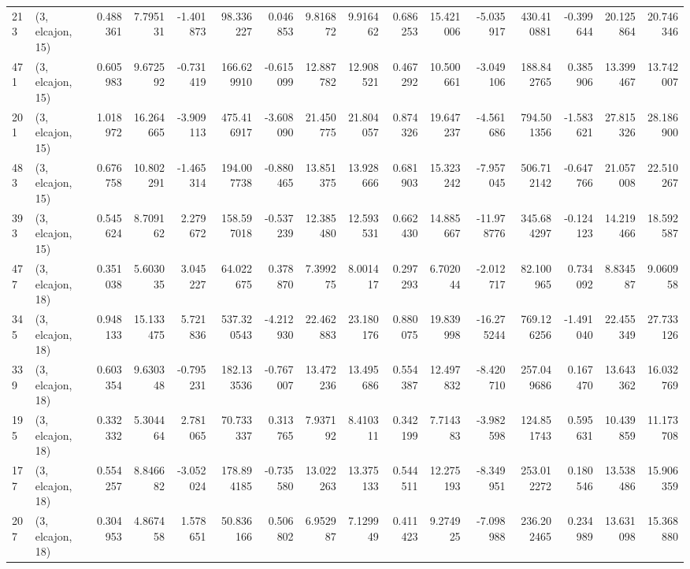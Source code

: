 \begin{tabular}{llrrrrrrrrrrrrrr}
213 &  (3, elcajon, 15) &   0.488361 &   7.795131 &  -1.401873 &    98.336227 &   0.046853 &   9.816872 &   9.916462 &  0.686253 &  15.421006 &  -5.035917 &   430.410881 &  -0.399644 &  20.125864 &  20.746346 \\
471 &  (3, elcajon, 15) &   0.605983 &   9.672592 &  -0.731419 &   166.629910 &  -0.615099 &  12.887782 &  12.908521 &  0.467292 &  10.500661 &  -3.049106 &   188.842765 &   0.385906 &  13.399467 &  13.742007 \\
201 &  (3, elcajon, 15) &   1.018972 &  16.264665 &  -3.909113 &   475.416917 &  -3.608090 &  21.450775 &  21.804057 &  0.874326 &  19.647237 &  -4.561686 &   794.501356 &  -1.583621 &  27.815326 &  28.186900 \\
483 &  (3, elcajon, 15) &   0.676758 &  10.802291 &  -1.465314 &   194.007738 &  -0.880465 &  13.851375 &  13.928666 &  0.681903 &  15.323242 &  -7.957045 &   506.712142 &  -0.647766 &  21.057008 &  22.510267 \\
393 &  (3, elcajon, 15) &   0.545624 &   8.709162 &   2.279672 &   158.597018 &  -0.537239 &  12.385480 &  12.593531 &  0.662430 &  14.885667 & -11.978776 &   345.684297 &  -0.124123 &  14.219466 &  18.592587 \\
477 &  (3, elcajon, 18) &   0.351038 &   5.603035 &   3.045227 &    64.022675 &   0.378870 &   7.399275 &   8.001417 &  0.297293 &   6.702044 &  -2.012717 &    82.100965 &   0.734092 &   8.834587 &   9.060958 \\
345 &  (3, elcajon, 18) &   0.948133 &  15.133475 &   5.721836 &   537.320543 &  -4.212930 &  22.462883 &  23.180176 &  0.880075 &  19.839998 & -16.275244 &   769.126256 &  -1.491040 &  22.455349 &  27.733126 \\
339 &  (3, elcajon, 18) &   0.603354 &   9.630348 &  -0.795231 &   182.133536 &  -0.767007 &  13.472236 &  13.495686 &  0.554387 &  12.497832 &  -8.420710 &   257.049686 &   0.167470 &  13.643362 &  16.032769 \\
195 &  (3, elcajon, 18) &   0.332332 &   5.304464 &   2.781065 &    70.733337 &   0.313765 &   7.937192 &   8.410311 &  0.342199 &   7.714383 &  -3.982598 &   124.851743 &   0.595631 &  10.439859 &  11.173708 \\
177 &  (3, elcajon, 18) &   0.554257 &   8.846682 &  -3.052024 &   178.894185 &  -0.735580 &  13.022263 &  13.375133 &  0.544511 &  12.275193 &  -8.349951 &   253.012272 &   0.180546 &  13.538486 &  15.906359 \\
207 &  (3, elcajon, 18) &   0.304953 &   4.867458 &   1.578651 &    50.836166 &   0.506802 &   6.952987 &   7.129949 &  0.411423 &   9.274925 &  -7.098988 &   236.202465 &   0.234989 &  13.631098 &  15.368880 \\

\end{tabular}
